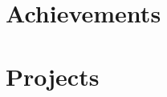 \documentclass[letterpaper, 10pt]{article}
\begin{document}



\section{Achievements}




\section{Projects}







% 


% 
\end{document}
